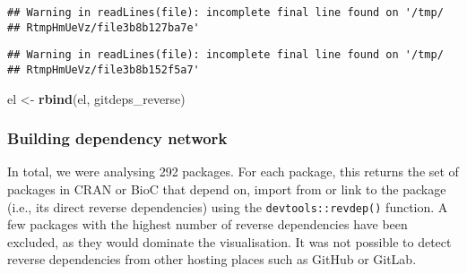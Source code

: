 \documentclass[]{article}
\newenvironment{Shaded}{\begin{snugshade}}{\end{snugshade}}
\newcommand{\DataTypeTok}[1]{\textcolor[rgb]{0.13,0.29,0.53}{#1}}
\newcommand{\KeywordTok}[1]{\textcolor[rgb]{0.13,0.29,0.53}{\textbf{#1}}}
\newcommand{\NormalTok}[1]{#1}
\newcommand{\OperatorTok}[1]{\textcolor[rgb]{0.81,0.36,0.00}{\textbf{#1}}}
\newcommand{\StringTok}[1]{\textcolor[rgb]{0.31,0.60,0.02}{#1}}
\begin{document}
\begin{Shaded}
\end{Shaded}

\begin{verbatim}
## Warning in readLines(file): incomplete final line found on '/tmp/
## RtmpHmUeVz/file3b8b127ba7e'
\end{verbatim}

\begin{verbatim}
## Warning in readLines(file): incomplete final line found on '/tmp/
## RtmpHmUeVz/file3b8b152f5a7'
\end{verbatim}

\begin{Shaded}
\begin{Highlighting}[]
\NormalTok{el <-}\StringTok{ }\KeywordTok{rbind}\NormalTok{(el, gitdeps_reverse)}
\end{Highlighting}
\end{Shaded}

\hypertarget{building-dependency-network}{%
\subsubsection*{Building dependency network}\label{building-dependency-network}}

In total, we were analysing 292 packages.
For each package, this returns the set of packages in CRAN or BioC that depend on, import from or link to the package (i.e., its direct reverse dependencies) using the \texttt{devtools::revdep()} function. A few packages with the highest number of reverse dependencies have been excluded, as they would dominate the visualisation.
It was not possible to detect reverse dependencies from other hosting places such as GitHub or GitLab.
\end{document}
